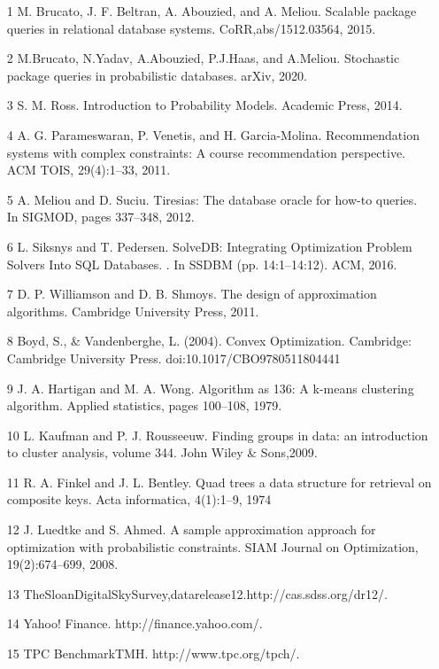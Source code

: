 \documentclass[a4paper,12pt]{article}
\begin{document}
\begin{enumerate}
  \item [1] M. Brucato, J. F. Beltran, A. Abouzied, and A. Meliou. Scalable package queries in relational database systems. CoRR,abs/1512.03564, 2015.  
  \item [2] M.Brucato, N.Yadav, A.Abouzied, P.J.Haas, and A.Meliou. Stochastic package queries in probabilistic databases. arXiv, 2020.
  \item [3] S. M. Ross. Introduction to Probability Models. Academic Press, 2014.
  \item [4] A. G. Parameswaran, P. Venetis, and H. Garcia-Molina. Recommendation systems with complex constraints: A course recommendation perspective. ACM TOIS, 29(4):1–33, 2011.
  \item [5] A. Meliou and D. Suciu. Tiresias: The database oracle for how-to queries. In SIGMOD, pages 337–348, 2012.
  \item [6] L. Siksnys and T. Pedersen. SolveDB: Integrating Optimization Problem Solvers Into SQL Databases. . In SSDBM (pp. 14:1–14:12). ACM, 2016.
  \item [7] D. P. Williamson and D. B. Shmoys. The design of approximation algorithms. Cambridge University Press, 2011.
  \item [8] Boyd, S., & Vandenberghe, L. (2004). Convex Optimization. Cambridge: Cambridge University Press. doi:10.1017/CBO9780511804441
  \item [9] J. A. Hartigan and M. A. Wong. Algorithm as 136: A k-means clustering algorithm. Applied statistics, pages 100–108, 1979.
  \item [10] L. Kaufman and P. J. Rousseeuw. Finding groups in data: an introduction to cluster analysis, volume 344. John Wiley & Sons,2009.
  \item [11] R. A. Finkel and J. L. Bentley. Quad trees a data structure for retrieval on composite keys. Acta informatica, 4(1):1–9, 1974
  \item [12] J. Luedtke and S. Ahmed. A sample approximation approach for optimization with probabilistic constraints. SIAM Journal on Optimization, 19(2):674–699, 2008.
  \item [13] TheSloanDigitalSkySurvey,datarelease12.http://cas.sdss.org/dr12/.
  \item [14] Yahoo! Finance. http://finance.yahoo.com/.
  \item [15] TPC BenchmarkTMH. http://www.tpc.org/tpch/.
  
\end{enumerate}
\end{document}
